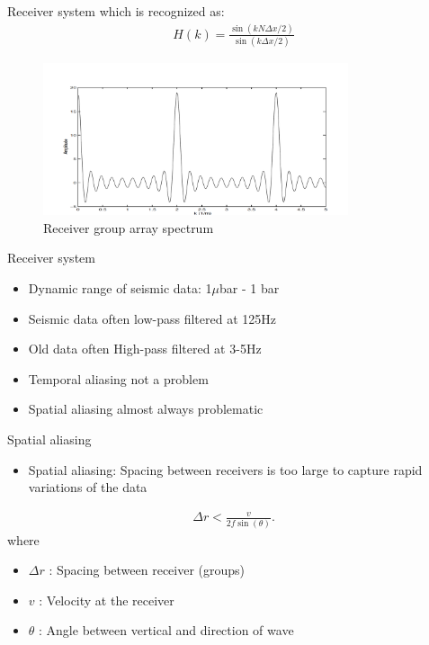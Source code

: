 \documentclass[xcolor=dvipsnames,notes]{beamer}
\begin{document}
\begin{frame}{Receiver system}
which is recognized as:
\begin{eqnarray}
H(k)  = 
                 \frac{\sin(kN\Delta x/2)}{\sin(k\Delta x/2)}
\end{eqnarray}
\begin{figure}
  \includegraphics[width=0.8\textwidth]{Fig/array-spec.png}
  \caption{Receiver group array spectrum}
  \label{fig:array}
\end{figure}
\end{frame}
\begin{frame}{Receiver system}
\begin{itemize}
\item Dynamic range of seismic data: 1$\mu$bar - 1 bar 
\item Seismic data often low-pass filtered at 125Hz
\item Old data often High-pass filtered at 3-5Hz
\item Temporal aliasing not a problem
\item Spatial aliasing almost always problematic
\end{itemize}
\end{frame}
\begin{frame}{Spatial aliasing}
\begin{itemize}
\item Spatial aliasing: Spacing between receivers is too large
                  to capture rapid variations of the data
\end{itemize}

\begin{eqnarray}
   \Delta r < \frac{v}{2f\sin(\theta)}.
\end{eqnarray}
where

\begin{itemize}
\item $\Delta r$ : Spacing between receiver (groups)
\item $v$        : Velocity at the receiver 
\item $\theta$   : Angle between vertical and direction of wave
\end{itemize}
 
\end{frame}
\end{document}

